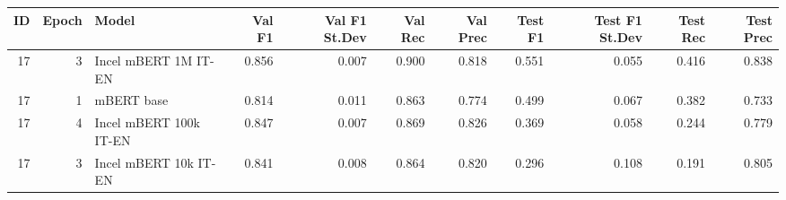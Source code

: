 \begin{tabular}{rrlrrrrrrrr}
\toprule
 ID &  Epoch &                  Model &  Val F1 &  Val F1 St.Dev &  Val Rec &  Val Prec &  Test F1 &  Test F1 St.Dev &  Test Rec &  Test Prec \\
\midrule
 17 &      3 &   Incel mBERT 1M IT-EN &   0.856 &          0.007 &    0.900 &     0.818 &    0.551 &           0.055 &     0.416 &      0.838 \\
 17 &      1 &             mBERT base &   0.814 &          0.011 &    0.863 &     0.774 &    0.499 &           0.067 &     0.382 &      0.733 \\
 17 &      4 & Incel mBERT 100k IT-EN &   0.847 &          0.007 &    0.869 &     0.826 &    0.369 &           0.058 &     0.244 &      0.779 \\
 17 &      3 &  Incel mBERT 10k IT-EN &   0.841 &          0.008 &    0.864 &     0.820 &    0.296 &           0.108 &     0.191 &      0.805 \\
\bottomrule
\end{tabular}

